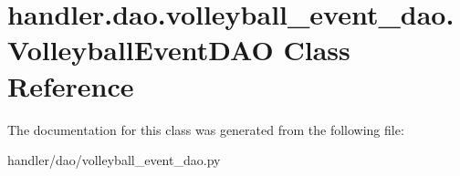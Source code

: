 \hypertarget{classhandler_1_1dao_1_1volleyball__event__dao_1_1_volleyball_event_d_a_o}{}\section{handler.\+dao.\+volleyball\+\_\+event\+\_\+dao.\+Volleyball\+Event\+D\+AO Class Reference}
\label{classhandler_1_1dao_1_1volleyball__event__dao_1_1_volleyball_event_d_a_o}


The documentation for this class was generated from the following file\+:\begin{DoxyCompactItemize}
\item 
handler/dao/volleyball\+\_\+event\+\_\+dao.\+py\end{DoxyCompactItemize}
